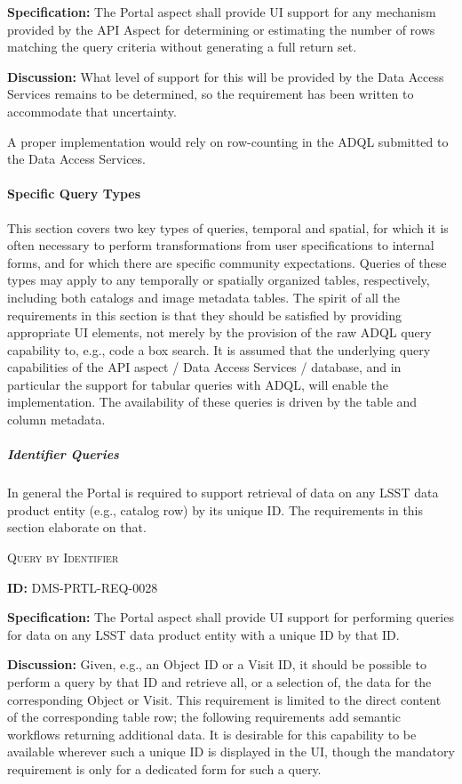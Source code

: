 \documentclass[SE,toc,lsstdraft]{lsstdoc}
\begin{document}
\textbf{Specification:}
The Portal aspect shall provide UI support for any mechanism provided by the API Aspect for determining or estimating the number of rows matching the query criteria without generating a full return set.

\textbf{Discussion:}
What level of support for this will be provided by the Data Access Services remains to be determined, so the requirement has been written to accommodate that uncertainty.

A proper implementation would rely on row-counting in the ADQL submitted to the Data Access Services.

\paragraph{Specific Query Types}\hfill  %

This section covers two key types of queries, temporal and spatial, for which it is often necessary to perform transformations from user specifications to internal forms, and for which there are specific community expectations.
Queries of these types may apply to any temporally or spatially organized tables, respectively, including both catalogs and image metadata tables.
The spirit of all the requirements in this section is that they should be satisfied by providing appropriate UI elements, not merely by the provision of the raw ADQL query capability to, e.g., code a box search.
It is assumed that the underlying query capabilities of the API aspect / Data Access Services / database, and in particular the support for tabular queries with ADQL, will enable the implementation.
The availability of these queries is driven by the table and column metadata.

\subparagraph{Identifier Queries}\hfill  %

In general the Portal is required to support retrieval of data on any LSST data product entity (e.g., catalog row) by its unique ID.  The requirements in this section elaborate on that.

\textsc{Query by Identifier}

\label{DMS-PRTL-REQ-0028}
\textbf{ID:} DMS-PRTL-REQ-0028

\textbf{Specification:}
The Portal aspect shall provide UI support for performing queries for data on any LSST data product entity with a unique ID by that ID.

\textbf{Discussion:}
Given, e.g., an Object ID or a Visit ID, it should be possible to perform a query by that ID and retrieve all, or a selection of, the data for the corresponding Object or Visit.  This requirement is limited to the direct content of the corresponding table row; the following requirements add semantic workflows returning additional data.
It is desirable for this capability to be available wherever such a unique ID is displayed in the UI, though the mandatory requirement is only for a dedicated form for such a query.
\end{document}
